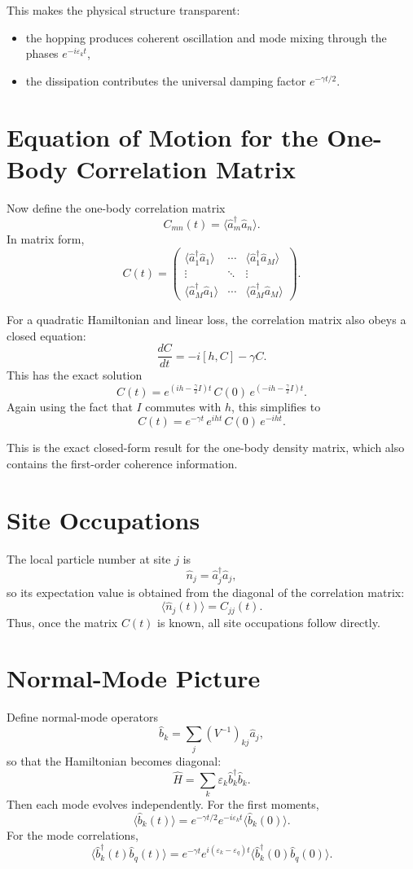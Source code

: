 \documentclass[12pt]{article}
\begin{document}
This makes the physical structure transparent:
\begin{itemize}
\item the hopping produces coherent oscillation and mode mixing through the phases $e^{-i\varepsilon_k t}$,
\item the dissipation contributes the universal damping factor $e^{-\gamma t/2}$.
\end{itemize}

\section*{Equation of Motion for the One-Body Correlation Matrix}
Now define the one-body correlation matrix
\[
C_{mn}(t)=\langle \hat a_m^\dagger \hat a_n\rangle.
\]
In matrix form,
\[
C(t) =
\begin{pmatrix}
\langle \hat a_1^\dagger \hat a_1\rangle & \cdots & \langle \hat a_1^\dagger \hat a_M\rangle\\
\vdots & \ddots & \vdots\\
\langle \hat a_M^\dagger \hat a_1\rangle & \cdots & \langle \hat a_M^\dagger \hat a_M\rangle
\end{pmatrix}.
\]

For a quadratic Hamiltonian and linear loss, the correlation matrix also obeys a closed equation:
\[
\boxed{
\frac{dC}{dt}
=
-i[h,C]-\gamma C.
}
\]
This has the exact solution
\[
\boxed{
C(t)
=
e^{\left(ih-\frac{\gamma}{2}I\right)t}
\,C(0)\,
e^{\left(-ih-\frac{\gamma}{2}I\right)t}.
}
\]
Again using the fact that $I$ commutes with $h$, this simplifies to
\[
\boxed{
C(t)
=
e^{-\gamma t}\,
e^{iht}\,
C(0)\,
e^{-iht}.
}
\]

This is the exact closed-form result for the one-body density matrix, which also contains the first-order coherence information.

\section*{Site Occupations}
The local particle number at site $j$ is
\[
\hat n_j = \hat a_j^\dagger \hat a_j,
\]
so its expectation value is obtained from the diagonal of the correlation matrix:
\[
\boxed{
\langle \hat n_j(t)\rangle = C_{jj}(t).
}
\]
Thus, once the matrix $C(t)$ is known, all site occupations follow directly.

\section*{Normal-Mode Picture}
Define normal-mode operators
\[
\hat b_k = \sum_j (V^{-1})_{kj}\hat a_j,
\]
so that the Hamiltonian becomes diagonal:
\[
\hat H = \sum_k \varepsilon_k \hat b_k^\dagger \hat b_k.
\]
Then each mode evolves independently. For the first moments,
\[
\boxed{
\langle \hat b_k(t)\rangle
=
e^{-\gamma t/2}e^{-i\varepsilon_k t}\langle \hat b_k(0)\rangle.
}
\]
For the mode correlations,
\[
\boxed{
\langle \hat b_k^\dagger(t)\hat b_q(t)\rangle
=
e^{-\gamma t}e^{i(\varepsilon_k-\varepsilon_q)t}
\langle \hat b_k^\dagger(0)\hat b_q(0)\rangle.
}
\]
\end{document}
